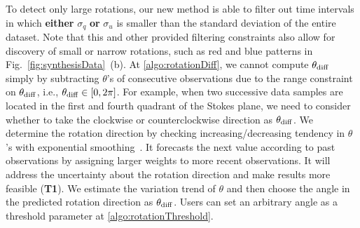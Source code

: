 %
To detect only large rotations, 
our new method is able to filter out time intervals in which \textbf{either} $\sigma_{q}$ \textbf{or} $ \sigma_{u}$ is smaller than the standard deviation of the entire dataset. %
Note that this and other provided filtering constraints also allow for discovery of small or narrow rotations, such as red and blue patterns in Fig.~\ref{fig:synthesisData}~(b).
%
At \ref{algo:rotationDiff}, we cannot compute $\theta_{\rm diff}$ simply by subtracting $\theta$'s of consecutive observations 
due to the range constraint on $\theta_{\rm diff}$, i.e., $\theta_{\rm diff} \in [0, 2\pi]$. 
For example, when two successive data samples are located in the first and fourth quadrant of the Stokes plane, 
we need to consider whether to take the clockwise or counterclockwise direction as $\theta_{\rm diff}$. 
We determine the rotation direction 
by checking increasing/decreasing tendency in $\theta$'s with exponential smoothing~\cite{Brown1956}.
It forecasts the next value according to past observations by assigning larger weights to more recent observations.
It will address the uncertainty about the rotation direction and make results more feasible (\textbf{T1}).
We estimate the variation trend of $\theta$ and
then choose the angle in the predicted rotation direction as $\theta_{\rm diff}$.
Users can set an arbitrary angle as a threshold parameter at \ref{algo:rotationThreshold}.

